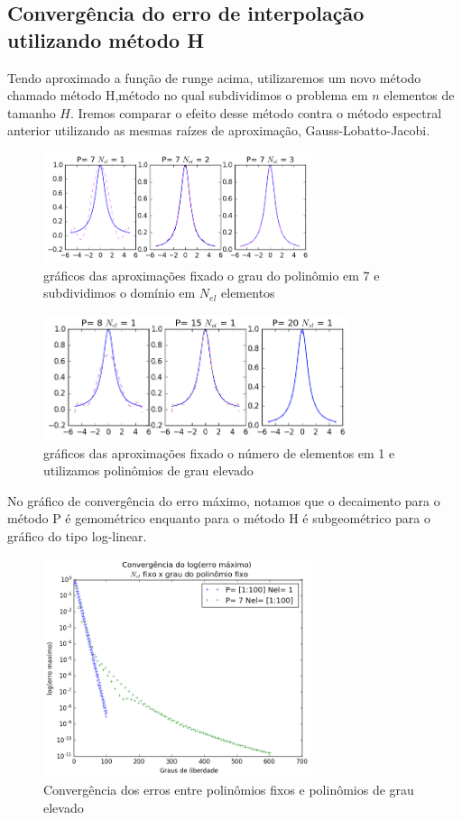 \subsection{Convergência do erro de interpolação utilizando método H}
 Tendo aproximado a função de runge acima, utilizaremos um novo método chamado método H,método no qual subdividimos o problema em $n$ elementos de tamanho $H$. Iremos comparar o efeito desse método contra o método espectral anterior utilizando as mesmas raízes de aproximação, Gauss-Lobatto-Jacobi.

\begin{figure}[H]
\centering
\includegraphics[width=0.7\textwidth,center]{figuras/interp_usando_FEM.png}
\caption{gráficos das aproximações fixado o grau do polinômio em 7 e subdividimos o domínio em $N_{el}$ elementos }
\end{figure}

\begin{figure}[H]
  \includegraphics[width=0.8\textwidth,center]{figuras/interp_usando_FEMfixo.png}
  \caption{gráficos das aproximações fixado o número de elementos em 1 e utilizamos polinômios de grau elevado}
\end{figure}
 No gráfico de convergência do erro máximo, notamos que o decaimento para o método P é gemométrico enquanto para o método H é subgeométrico para o gráfico do tipo log-linear.
 \begin{figure}[H]
  \includegraphics[width=0.7\textwidth,center]{figuras/convergencia_erro_FEM2.png}
  \caption{Convergência dos erros entre polinômios fixos e polinômios de grau elevado}
\end{figure}

